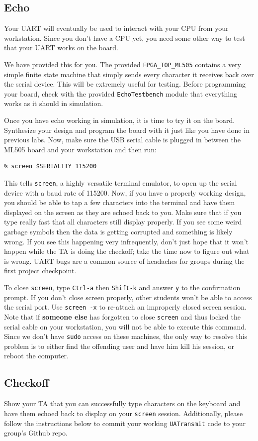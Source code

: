 \documentclass[11pt]{article}
\begin{document}
\subsection{Echo}
Your UART will eventually be used to interact with your CPU from your workstation. Since you don't have a CPU yet, you need some other way to test that your UART works on the board.

We have provided this for you. The provided \verb|FPGA_TOP_ML505| contains a very simple finite state machine that simply sends every character it receives back over the serial device. This will be extremely useful for testing. Before programming your board, check with the provided \verb|EchoTestbench| module that everything works as it should in simulation.

Once you have echo working in simulation, it is time to try it on the board. Synthesize your design and program the board with it just like you have done in previous labs. Now, make sure the USB serial cable is plugged in between the ML505 board and your workstation and then run:
\begin{verbatim}
% screen $SERIALTTY 115200
\end{verbatim}
This tells \verb|screen|, a highly versatile terminal emulator, to open up the serial device with a baud rate of 115200. Now, if you have a properly working design, you should be able to tap a few characters into the terminal and have them displayed on the screen as they are echoed back to you. Make sure that if you type really fast that all characters still display properly. If you see some weird garbage symbols then the data is getting corrupted and something is likely wrong. If you see this happening very infrequently, don't just hope that it won't happen while the TA is doing the checkoff; take the time now to figure out what is wrong. UART bugs are a common source of headaches for groups during the first project checkpoint. 

To close \verb|screen|, type \verb|Ctrl-a| then \verb|Shift-k| and answer \verb|y| to the confirmation prompt. If you don't close screen properly, other students won't be able to access the serial port. Use \verb|screen -x| to re-attach an improperly closed screen session. Note that if \textbf{someone else} has forgotten to close \verb|screen| and thus locked the serial cable on your workstation, you will not be able to execute this command. Since we don’t have \verb|sudo| access on these machines, the only way to resolve this problem is to either find the offending user and have him kill his session, or reboot the computer.

\subsection{Checkoff}
Show your TA that you can successfully type characters on the keyboard and have them echoed back to display on your \verb|screen| session. Additionally, please follow the instructions below to commit your working \verb|UATransmit| code to your group's Github repo.
\end{document}

